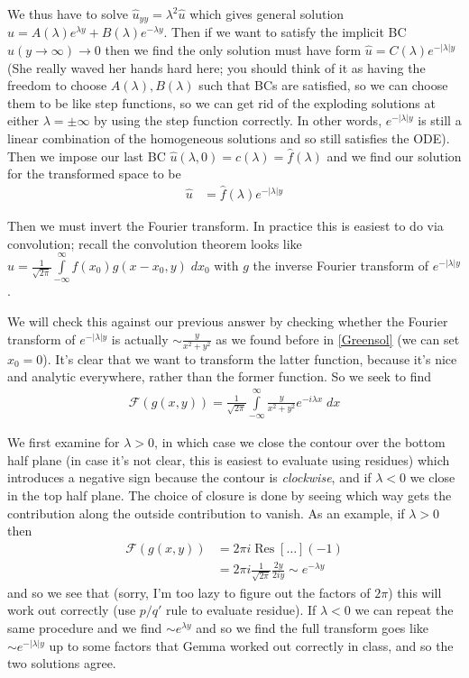 \documentclass[12pt]{article}
\newcommand{\abs}[1]{\left|#1\right|}
\DeclareMathOperator{\Res}{Res}
\begin{document}
We thus have to solve $\hat{u}_{yy} = \lambda^2 \hat{u}$ which gives general solution $\hat{u} = A(\lambda)e^{\lambda y} + B(\lambda) e^{-\lambda y}$. Then if we want to satisfy the implicit BC $\hat{u}(y \to \infty) \to 0$ then we find the only solution must have form $\hat{u} = C(\lambda)e^{-\abs{\lambda}y}$ (She really waved her hands hard here; you should think of it as having the freedom to choose $A(\lambda), B(\lambda)$ such that BCs are satisfied, so we can choose them to be like step functions, so we can get rid of the exploding solutions at either $\lambda = \pm \infty$ by using the step function correctly. In other words, $e^{-\abs{\lambda} y}$ is still a linear combination of the homogeneous solutions and so still satisfies the ODE). Then we impose our last BC $\hat{u}(\lambda,0) = c(\lambda) = \hat{f}(\lambda)$ and we find our solution for the transformed space to be
\begin{align}
    \hat{u} &= \hat{f}(\lambda)e^{-\abs{\lambda}y}
\end{align}

Then we must invert the Fourier transform. In practice this is easiest to do via convolution; recall the convolution theorem looks like $u = \frac{1}{\sqrt{2\pi}}\int\limits_{-\infty}^{\infty}f(x_0)g(x-x_0,y)\;dx_0$ with $g$ the inverse Fourier transform of $e^{-\abs{\lambda}y}$.

We will check this against our previous answer by checking whether the Fourier transform of $e^{-\abs{\lambda }y}$ is actually $\sim \frac{y}{x^2 + y^2}$ as we found before in \eqref{Greensol} (we can set $x_0 = 0$). It's clear that we want to transform the latter function, because it's nice and analytic everywhere, rather than the former function. So we seek to find
\begin{align}
    \mathcal{F}\left( g(x,y) \right) = \frac{1}{\sqrt{2\pi}}\int\limits_{-\infty}^{\infty}\frac{y}{x^2 + y^2}e^{-i\lambda x}\;dx
\end{align}

We first examine for $\lambda > 0$, in which case we close the contour over the bottom half plane (in case it's not clear, this is easiest to evaluate using residues) which introduces a negative sign because the contour is \emph{clockwise}, and if $\lambda < 0$ we close in the top half plane. The choice of closure is done by seeing which way gets the contribution along the outside contribution to vanish. As an example, if $\lambda > 0$ then
\begin{align}
    \mathcal{F}\left( g(x,y) \right) &= 2\pi i\Res\left[ \dots \right](-1)\\
    &= 2\pi i \frac{1}{\sqrt{2\pi}}\frac{2y}{2iy} \sim e^{-\lambda y}
\end{align}
and so we see that (sorry, I'm too lazy to figure out the factors of $2\pi$) this will work out correctly (use $p/q'$ rule to evaluate residue). If $\lambda < 0$ we can repeat the same procedure and we find $\sim e^{\lambda y}$ and so we find the full transform goes like $\sim e^{-\abs{\lambda}y}$ up to some factors that Gemma worked out correctly in class, and so the two solutions agree.
\end{document}
